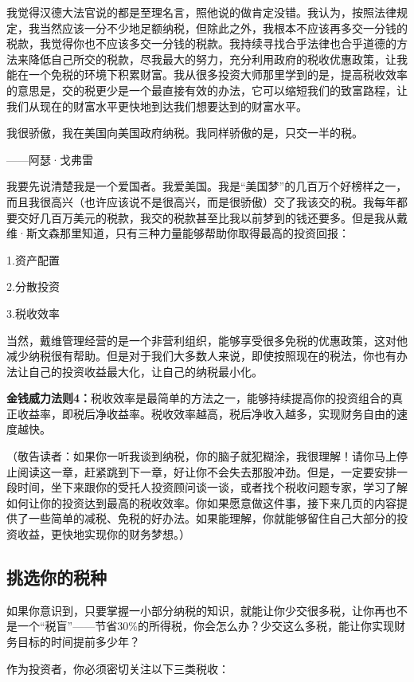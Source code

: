 我觉得汉德大法官说的都是至理名言，照他说的做肯定没错。我认为，按照法律规定，我当然应该一分不少地足额纳税，但除此之外，我根本不应该再多交一分钱的税款，我觉得你也不应该多交一分钱的税款。我持续寻找合乎法律也合乎道德的方法来降低自己所交的税款，尽我最大的努力，充分利用政府的税收优惠政策，让我能在一个免税的环境下积累财富。我从很多投资大师那里学到的是，提高税收效率的意思是，交的税更少是一个最直接有效的办法，它可以缩短我们的致富路程，让我们从现在的财富水平更快地到达我们想要达到的财富水平。

\begin{BookQuote}
我很骄傲，我在美国向美国政府纳税。我同样骄傲的是，只交一半的税。

\hfill ——阿瑟·戈弗雷
\end{BookQuote}

我要先说清楚我是一个爱国者。我爱美国。我是“美国梦”的几百万个好榜样之一，而且我很高兴（也许应该说不是很高兴，而是很骄傲）交了我该交的税。我每年都要交好几百万美元的税款，我交的税款甚至比我以前梦到的钱还要多。但是我从戴维·斯文森那里知道，只有三种力量能够帮助你取得最高的投资回报：

1.资产配置

2.分散投资

3.税收效率

当然，戴维管理经营的是一个非营利组织，能够享受很多免税的优惠政策，这对他减少纳税很有帮助。但是对于我们大多数人来说，即使按照现在的税法，你也有办法让自己的投资收益最大化，让自己的纳税最小化。

\textbf{金钱威力法则4：}税收效率是最简单的方法之一，能够持续提高你的投资组合的真正收益率，即税后净收益率。税收效率越高，税后净收入越多，实现财务自由的速度越快。

（敬告读者：如果你一听我谈到纳税，你的脑子就犯糊涂，我很理解！请你马上停止阅读这一章，赶紧跳到下一章，好让你不会失去那股冲劲。但是，一定要安排一段时间，坐下来跟你的受托人投资顾问谈一谈，或者找个税收问题专家，学习了解如何让你的投资达到最高的税收效率。你如果愿意做这件事，接下来几页的内容提供了一些简单的减税、免税的好办法。如果能理解，你就能够留住自己大部分的投资收益，更快地实现你的财务梦想。）

\subsection{挑选你的税种}

如果你意识到，只要掌握一小部分纳税的知识，就能让你少交很多税，让你再也不是一个“税盲”——节省30\%的所得税，你会怎么办？少交这么多税，能让你实现财务目标的时间提前多少年？

作为投资者，你必须密切关注以下三类税收：

